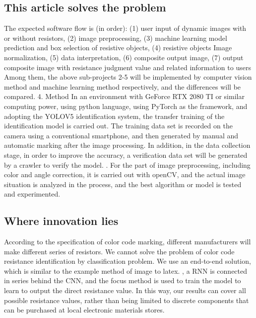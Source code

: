 \documentclass{article}
\begin{document}
\subsection{This article solves the problem}
The expected software flow is (in order): (1) user input of dynamic images with or without resistors, (2) image preprocessing, (3) machine learning model prediction and box selection of resistive objects, (4) resistive objects Image normalization, (5) data interpretation, (6) composite output image, (7) output composite image with resistance judgment value and related information to users
Among them, the above sub-projects 2-5 will be implemented by computer vision method and machine learning method respectively, and the differences will be compared.
4. Method
In an environment with GeForce RTX 2080 TI or similar computing power, using python language, using PyTorch as the framework, and adopting the YOLOV5 identification system, the transfer training of the identification model is carried out. The training data set is recorded on the camera using a conventional smartphone, and then generated by manual and automatic marking after the image processing. In addition, in the data collection stage, in order to improve the accuracy, a verification data set will be generated by a crawler to verify the model. .
For the part of image preprocessing, including color and angle correction, it is carried out with openCV, and the actual image situation is analyzed in the process, and the best algorithm or model is tested and experimented.

\subsection{Where innovation lies}
According to the specification of color code marking, different manufacturers will make different series of resistors. We cannot solve the problem of color code resistance identification by classification problem. We use an end-to-end solution, which is similar to the example method of image to latex. , a RNN is connected in series behind the CNN, and the focus method is used to train the model to learn to output the direct resistance value. In this way, our results can cover all possible resistance values, rather than being limited to discrete components that can be purchased at local electronic materials stores.
\end{document}
